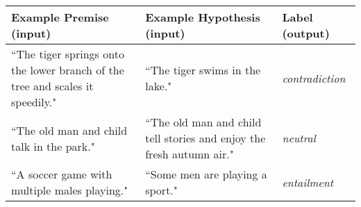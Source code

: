 \begin{center} 
\begin{tabularx}{0.8\textwidth} { 
  | >{\raggedright\arraybackslash}X
  | >{\raggedright\arraybackslash}X 
  | >{\centering\arraybackslash}X | } \hline 
  
\rowcolor{MyLavender} \textbf{Example Premise (input) }
& \textbf{Example Hypothesis (input)} 
& \textbf{Label (output)} \\ 

\hline

``The tiger springs onto the lower branch of the tree and scales it speedily."  
& ``The tiger swims in the lake."  
& \emph{contradiction}  \\ 

\hline 

``The old man and child talk in the park."
& ``The old man and child tell stories and enjoy the fresh autumn air."
& \emph{neutral} \\ 

\hline 

``A soccer game with multiple males playing." 
& ``Some men are playing a sport."
& \emph{entailment} \\ 

\hline  

\end{tabularx}
\end{center}
\endgroup




